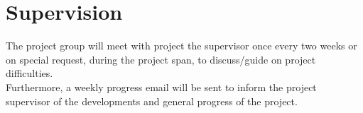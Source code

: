 \section*{Supervision}
The project group will meet with project the supervisor once every two weeks or on special request, during the project span, to discuss/guide on project difficulties.\\
Furthermore, a weekly progress email will be sent to inform the project supervisor of the developments and general progress of the project.